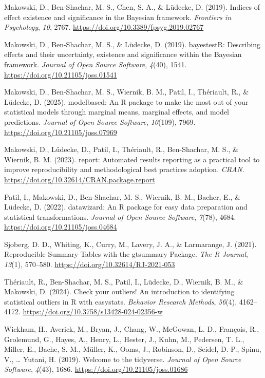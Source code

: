 \documentclass{article}
\newlength{\cslhangindent}
\newenvironment{CSLReferences}[2] %
 {\begin{list}{}{%
  \setlength{\itemindent}{0pt}
  \setlength{\leftmargin}{0pt}
  \setlength{\parsep}{0pt}
  \ifodd #1
   \setlength{\leftmargin}{\cslhangindent}
   \setlength{\itemindent}{-1\cslhangindent}
  \fi
  \setlength{\itemsep}{#2\baselineskip}}}
 {\end{list}}
\begin{document}
\begin{CSLReferences}{1}{0}
Makowski, D., Ben-Shachar, M. S., Chen, S. A., \& Lüdecke, D. (2019).
Indices of effect existence and significance in the {Bayesian}
framework. \emph{Frontiers in Psychology}, \emph{10}, 2767.
\url{https://doi.org/10.3389/fpsyg.2019.02767}

Makowski, D., Ben-Shachar, M. S., \& Lüdecke, D. (2019). {bayestestR}:
Describing effects and their uncertainty, existence and significance
within the {Bayesian} framework. \emph{Journal of Open Source Software},
\emph{4}(40), 1541. \url{https://doi.org/10.21105/joss.01541}

Makowski, D., Ben-Shachar, M. S., Wiernik, B. M., Patil, I., Thériault,
R., \& Lüdecke, D. (2025). {modelbased}: An {R} package to make the most
out of your statistical models through marginal means, marginal effects,
and model predictions. \emph{Journal of Open Source Software},
\emph{10}(109), 7969. \url{https://doi.org/10.21105/joss.07969}

Makowski, D., Lüdecke, D., Patil, I., Thériault, R., Ben-Shachar, M. S.,
\& Wiernik, B. M. (2023). {report}: Automated results reporting as a
practical tool to improve reproducibility and methodological best
practices adoption. \emph{CRAN}.
\url{https://doi.org/10.32614/CRAN.package.report}

Patil, I., Makowski, D., Ben-Shachar, M. S., Wiernik, B. M., Bacher, E.,
\& Lüdecke, D. (2022). {datawizard}: An {R} package for easy data
preparation and statistical transformations. \emph{Journal of Open
Source Software}, \emph{7}(78), 4684.
\url{https://doi.org/10.21105/joss.04684}

Sjoberg, D. D., Whiting, K., Curry, M., Lavery, J. A., \& Larmarange, J.
(2021). {Reproducible Summary Tables with the gtsummary Package}.
\emph{{The R Journal}}, \emph{13}(1), 570--580.
\url{https://doi.org/10.32614/RJ-2021-053}

Thériault, R., Ben-Shachar, M. S., Patil, I., Lüdecke, D., Wiernik, B.
M., \& Makowski, D. (2024). Check your outliers! An introduction to
identifying statistical outliers in {R} with easystats. \emph{Behavior
Research Methods}, \emph{56}(4), 4162--4172.
\url{https://doi.org/10.3758/s13428-024-02356-w}

Wickham, H., Averick, M., Bryan, J., Chang, W., McGowan, L. D.,
François, R., Grolemund, G., Hayes, A., Henry, L., Hester, J., Kuhn, M.,
Pedersen, T. L., Miller, E., Bache, S. M., Müller, K., Ooms, J.,
Robinson, D., Seidel, D. P., Spinu, V., \ldots{} Yutani, H. (2019).
Welcome to the {tidyverse}. \emph{Journal of Open Source Software},
\emph{4}(43), 1686. \url{https://doi.org/10.21105/joss.01686}

\end{CSLReferences}



\end{document}
